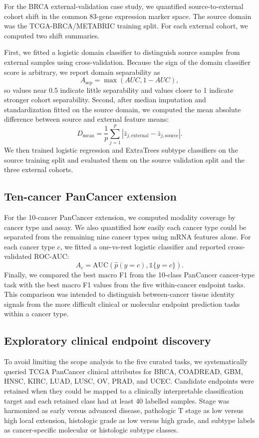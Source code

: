 For the BRCA external-validation case study, we quantified source-to-external cohort shift in the common 83-gene expression marker space. The source domain was the TCGA-BRCA/METABRIC training split. For each external cohort, we computed two shift summaries.

First, we fitted a logistic domain classifier to distinguish source samples from external samples using cross-validation. Because the sign of the domain classifier score is arbitrary, we report domain separability as
\[
A_{\mathrm{sep}}=\max(AUC, 1-AUC),
\]
so values near 0.5 indicate little separability and values closer to 1 indicate stronger cohort separability. Second, after median imputation and standardization fitted on the source domain, we computed the mean absolute difference between source and external feature means:
\[
D_{\mathrm{mean}} = \frac{1}{p}\sum_{j=1}^{p}\left|\bar{z}_{j,\mathrm{external}}-\bar{z}_{j,\mathrm{source}}\right|.
\]
We then trained logistic regression and ExtraTrees subtype classifiers on the source training split and evaluated them on the source validation split and the three external cohorts.

\subsection{Ten-cancer PanCancer extension}

For the 10-cancer PanCancer extension, we computed modality coverage by cancer type and assay. We also quantified how easily each cancer type could be separated from the remaining nine cancer types using mRNA features alone. For each cancer type \(c\), we fitted a one-vs-rest logistic classifier and reported cross-validated ROC-AUC:
\[
A_c = \mathrm{AUC}\left(\hat{p}(y=c), \mathbb{1}\{y=c\}\right).
\]
Finally, we compared the best macro F1 from the 10-class PanCancer cancer-type task with the best macro F1 values from the five within-cancer endpoint tasks. This comparison was intended to distinguish between-cancer tissue identity signals from the more difficult clinical or molecular endpoint prediction tasks within a cancer type.

\subsection{Exploratory clinical endpoint discovery}

To avoid limiting the scope analysis to the five curated tasks, we systematically queried TCGA PanCancer clinical attributes for BRCA, COADREAD, GBM, HNSC, KIRC, LUAD, LUSC, OV, PRAD, and UCEC. Candidate endpoints were retained when they could be mapped to a clinically interpretable classification target and each retained class had at least 40 labelled samples. Stage was harmonized as early versus advanced disease, pathologic T stage as low versus high local extension, histologic grade as low versus high grade, and subtype labels as cancer-specific molecular or histologic subtype classes.

